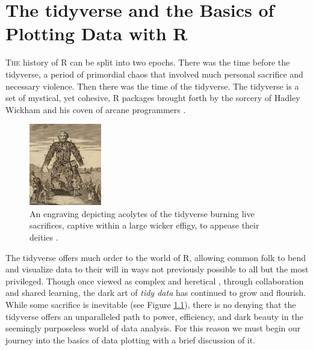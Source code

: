 \chapter{The tidyverse and the Basics of Plotting Data with R}

\lettrine{T}{he} history of R can be split into two epochs. There was the time before the tidyverse, a period of primordial chaos that involved much personal sacrifice and necessary violence. Then there was the time of the tidyverse. The tidyverse is a set of mystical, yet cohesive, R packages brought forth by the sorcery of Hadley Wickham and his coven of arcane programmers \parencite{Wickham2019}. 

\begin{figure}
  \begin{center}
    \includegraphics[width=0.28\textwidth]{graphics/ch2Figs/t_pennant.pdf}
  \end{center}
    \caption{An engraving depicting acolytes of the tidyverse burning live sacrifices, captive within a large wicker effigy, to appease their deities \parencite{Pennant1784}.}
    \label{fig:ch2_wicker}
\end{figure}


The tidyverse offers much order to the world of R, allowing common folk to bend and visualize data to their will in ways not previously possible to all but the most privileged. Though once viewed as complex and heretical \parencite{Muenchen}, through collaboration and shared learning, the dark art of \textit{tidy data} has continued to grow and flourish. While some sacrifice is inevitable (see Figure \ref{fig:ch2_wicker}), there is no denying that the tidyverse offers an unparalleled path to power, efficiency, and dark beauty in the seemingly purposeless world of data analysis. For this reason we must begin our journey into the basics of data plotting with a brief discussion of it.



